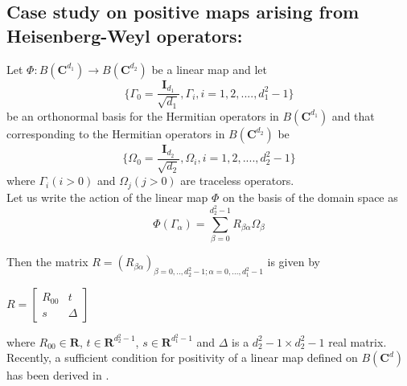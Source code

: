 \documentclass[12pt]{amsart}
\numberwithin{equation}{section}
\begin{document}
 





\subsection{ Case study on positive maps arising from Heisenberg-Weyl operators:}


Let $\Phi:B\left(\mathbf{C}^{d_1}\right) \rightarrow B\left(\mathbf{C}^{d_2}\right) $
be a linear map and let
\[\lbrace \Gamma_0=\frac{\mathbf{I}_{d_1}}{\sqrt{d_1}}, \Gamma_i , i=1,2,....,d_1^2-1 \rbrace\] be an orthonormal basis for the Hermitian operators in $B\left(\mathbf{C}^{d_1}\right)$ and that corresponding to the Hermitian operators in $B\left(\mathbf{C}^{d_2}\right)$ be 
\[\lbrace \Omega_0=\frac{\mathbf{I}_{d_2}}{\sqrt{d_2}}, \Omega_i , i=1,2,....,d_2^2-1 \rbrace\] where $\Gamma_i (i>0) $ and $\Omega_j (j>0)$ are traceless operators. \\
Let us write the action of the linear map $\Phi$ on the basis of the domain space as
\begin{equation} \label{map}
    \Phi(\Gamma_\alpha)=\sum_{\beta=0}^{d_2^{2}-1} R_{\beta \alpha} \Omega_{\beta}
\end{equation}

Then the matrix $R=\left( R_{\beta \alpha}\right)_{\beta=0,..,d_2^{2}-1; \alpha=0,...,d_1^{2}-1} $ is given by\\
\begin{center}
    $R=\begin{bmatrix}
    R_{00}& t\\
    s& \Delta
\end{bmatrix}$
\end{center}
where $R_{00} \in \mathbf{R}$, $t \in \mathbf{R}^{d_2^{2}-1}$, $s \in \mathbf{R}^{d_1^{2}-1}$ and $\Delta$ is a $d_2^{2}-1 \times d_2^{2}-1$ real matrix.\\

Recently, a sufficient condition for positivity of a linear map defined on $B\left(\mathbf{C}^d\right)$ has been derived in \cite{Jannesary2025}.
\end{document}
